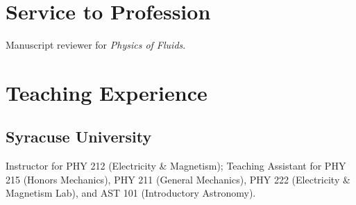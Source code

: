 \documentclass[10pt]{article}
\begin{document}
\section*{Service to Profession}

Manuscript reviewer for \emph{Physics of Fluids}.


\section*{Teaching Experience}

\subsection*{Syracuse University}

Instructor for PHY 212 (Electricity \& Magnetism); Teaching Assistant for PHY 215 (Honors Mechanics), PHY 211 (General Mechanics), PHY 222 (Electricity \& Magnetism Lab), and AST 101 (Introductory Astronomy).




\end{document}
